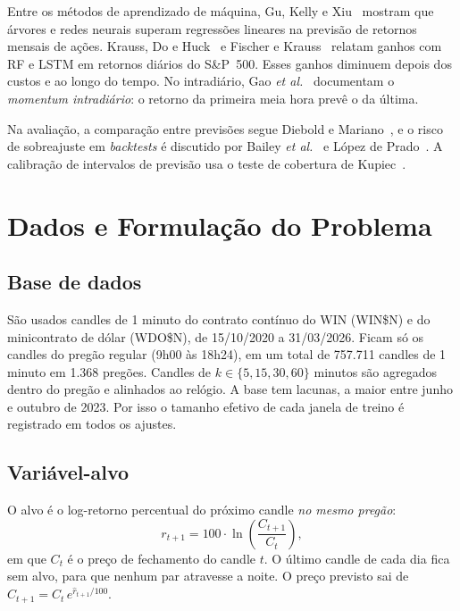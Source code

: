 \documentclass[conference]{IEEEtran}
\begin{document}
Entre os métodos de aprendizado de máquina, Gu, Kelly e Xiu~\cite{gu2020} mostram que árvores e redes neurais superam regressões lineares na previsão de retornos mensais de ações. Krauss, Do e Huck~\cite{krauss2017} e Fischer e Krauss~\cite{fischer2018} relatam ganhos com RF e LSTM em retornos diários do S\&P~500. Esses ganhos diminuem depois dos custos e ao longo do tempo. No intradiário, Gao \emph{et al.}~\cite{gao2018} documentam o \emph{momentum intradiário}: o retorno da primeira meia hora prevê o da última.

Na avaliação, a comparação entre previsões segue Diebold e Mariano~\cite{diebold1995}, e o risco de sobreajuste em \emph{backtests} é discutido por Bailey \emph{et al.}~\cite{bailey2014} e López de Prado~\cite{lopezdeprado2018}. A calibração de intervalos de previsão usa o teste de cobertura de Kupiec~\cite{kupiec1995}.

\section{Dados e Formulação do Problema}

\subsection{Base de dados}

São usados candles de 1 minuto do contrato contínuo do WIN (WIN\$N) e do minicontrato de dólar (WDO\$N), de 15/10/2020 a 31/03/2026. Ficam só os candles do pregão regular (9h00 às 18h24), em um total de 757.711 candles de 1 minuto em 1.368 pregões. Candles de $k \in \{5, 15, 30, 60\}$ minutos são agregados dentro do pregão e alinhados ao relógio. A base tem lacunas, a maior entre junho e outubro de 2023. Por isso o tamanho efetivo de cada janela de treino é registrado em todos os ajustes.

\subsection{Variável-alvo}

O alvo é o log-retorno percentual do próximo candle \emph{no mesmo pregão}:
\begin{equation}
  r_{t+1} = 100 \cdot \ln\!\left(\frac{C_{t+1}}{C_t}\right),
  \label{eq:alvo}
\end{equation}
em que $C_t$ é o preço de fechamento do candle $t$. O último candle de cada dia fica sem alvo, para que nenhum par atravesse a noite. O preço previsto sai de $\hat{C}_{t+1} = C_t \, e^{\hat r_{t+1}/100}$.
\end{document}
